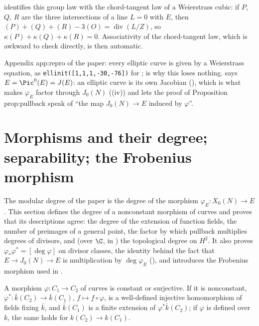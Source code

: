  identifies this group law with the chord-tangent law of a Weierstrass cubic: if $P$, $Q$, $R$ are the three intersections of a line
$L=0$ with $E$, then $(P)+(Q)+(R)-3(O)=\operatorname{div}(L/Z)$, so $\kappa(P)+\kappa(Q)+\kappa(R)=0$. Associativity of the chord-tangent law, which is awkward to check
directly, is then automatic.

\begin{paperlink}\label{pl:curves:weierstrass}
Appendix app:repro of the paper: every elliptic curve is given by a Weierstrass equation, as \texttt{ellinit([1,1,1,-30,-76])} for
;  is why this loses nothing.  says $E=\Pic^0(E)=J(E)$: an elliptic curve
is its own Jacobian (), which is what makes $\varphi_E$ factor through $J_0(N)$ ((iv)) and
lets the proof of Proposition prop:pullback speak of ``the map $J_0(N)\to E$ induced by $\varphi$''.
\end{paperlink}

\section[Morphisms and their degree; the Frobenius morphism]{Morphisms and their degree; separability; the Frobenius morphism}\label{sec:curves:morphisms}

The modular degree of the paper is the degree of the morphism $\varphi_E\colon X_0(N)\to E$. This section defines the degree of a nonconstant
morphism of curves and proves that its descriptions agree: the degree of the extension of function fields, the number of preimages of a general
point, the factor by which pullback multiplies degrees of divisors, and (over $\C$, in ) the
topological degree on $H^2$. It also proves $\varphi_*\varphi^*=[\deg\varphi]$ on divisor classes, the identity behind the fact that $E\to J_0(N)\to E$ is multiplication by
$\deg\varphi_E$ (), and introduces the Frobenius morphism used in .

\begin{theorem}\label{thm:curves:constant-or-surjective}
A morphism $\varphi\colon C_1\to C_2$ of curves is constant or surjective. If it is nonconstant, $\varphi^*\colon\bar k(C_2)\to\bar k(C_1)$, $f\mapsto f\circ\varphi$, is a
well-defined injective homomorphism of fields fixing $\bar k$, and $\bar k(C_1)$ is a finite extension of $\varphi^*\bar k(C_2)$; if $\varphi$ is defined over $k$, the same
holds for $k(C_2)\to k(C_1)$.
\end{theorem}

